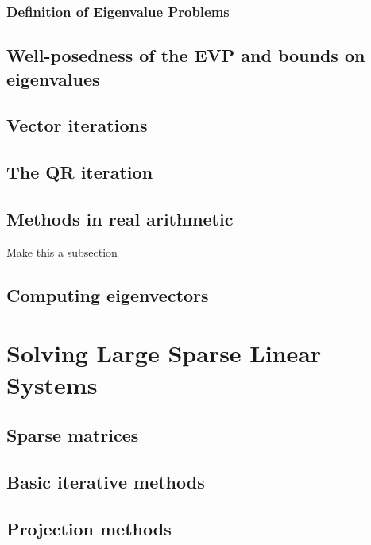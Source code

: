 \subsection{Definition of Eigenvalue Problems}

\section{Well-posedness of the EVP and bounds on eigenvalues}


\section{Vector iterations}


\section{The QR iteration}


\section{Methods in real arithmetic}

\begin{todo}
  Make this a subsection
\end{todo}



\section{Computing eigenvectors}

%

\chapter{Solving Large Sparse Linear Systems}
\label{chap:sparse}

\section{Sparse matrices}



\section{Basic iterative methods}


\section{Projection methods}


